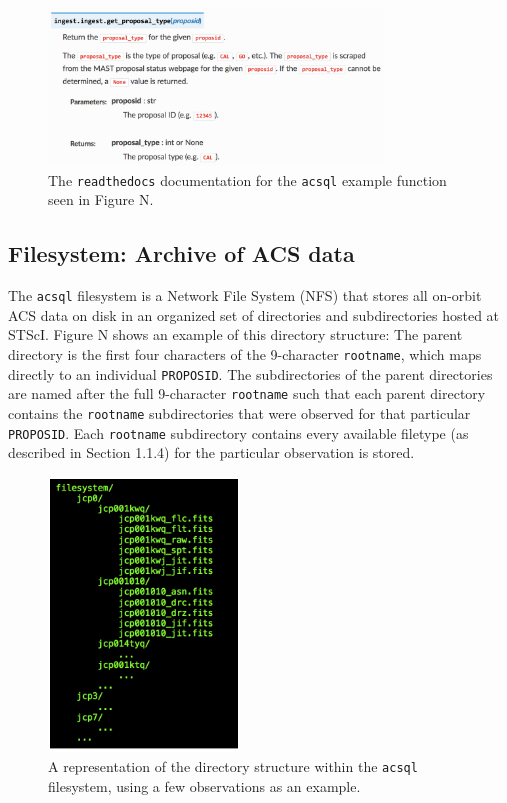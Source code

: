 \documentclass[10pt,journal,compsoc]{IEEEtran}
\begin{document}
\begin{figure}[!t]
\centering
\includegraphics[width=3.5in]{./figures/readthedocs.png}
\caption{The \texttt{readthedocs} documentation for the \texttt{acsql} example function
seen in Figure N.}
\label{fig1}
\end{figure}


\subsection{Filesystem: Archive of ACS data}

The \texttt{acsql} filesystem is a Network File System (NFS) that stores all on-orbit
ACS data on disk in an organized set of directories and subdirectories hosted at STScI. Figure N shows
an example of this directory structure: The parent directory is the first four characters
of the 9-character \texttt{rootname}, which maps directly to an individual \texttt{PROPOSID}.
The subdirectories of the parent directories are named after the full 9-character
\texttt{rootname} such that each parent directory contains the \texttt{rootname} subdirectories
that were observed for that particular \texttt{PROPOSID}.  Each \texttt{rootname}
subdirectory contains every available filetype (as described in Section 1.1.4) for the
particular observation is stored.

\begin{figure}[!t]
\centering
\includegraphics[width=2.0in]{./figures/filesystem_structure.png}
\caption{A representation of the directory structure within the \texttt{acsql} filesystem,
using a few observations as an example.}
\label{fig1}
\end{figure}
\end{document}
